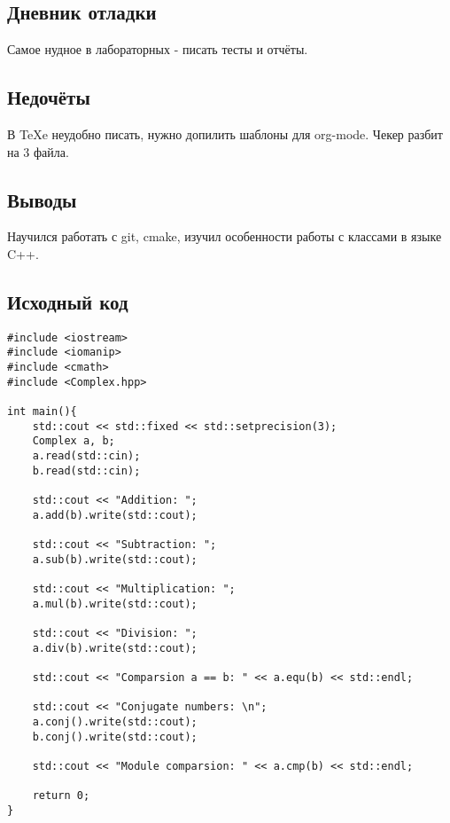 \documentclass[12pt]{article}
\begin{document}
\subsection*{Дневник отладки}

Самое нудное в лабораторных - писать тесты и отчёты.

\subsection*{Недочёты}

В TeXe неудобно писать, нужно допилить шаблоны для org-mode.
Чекер разбит на 3 файла.

\subsection*{Выводы}

Научился работать с git, cmake, изучил особенности работы с классами в языке C++.

\vfill

\subsection*{Исходный код}

\begin{lstlisting}[label=some-code,caption={main.cpp}]
#include <iostream>
#include <iomanip>
#include <cmath>
#include <Complex.hpp>

int main(){
    std::cout << std::fixed << std::setprecision(3);
    Complex a, b;
    a.read(std::cin);
    b.read(std::cin);

    std::cout << "Addition: ";
    a.add(b).write(std::cout);

    std::cout << "Subtraction: ";
    a.sub(b).write(std::cout);

    std::cout << "Multiplication: ";
    a.mul(b).write(std::cout);

    std::cout << "Division: ";
    a.div(b).write(std::cout);

    std::cout << "Comparsion a == b: " << a.equ(b) << std::endl;

    std::cout << "Conjugate numbers: \n";
    a.conj().write(std::cout);
    b.conj().write(std::cout);

    std::cout << "Module comparsion: " << a.cmp(b) << std::endl;

    return 0;
} 

\end{lstlisting}
\pagebreak
\end{document}
